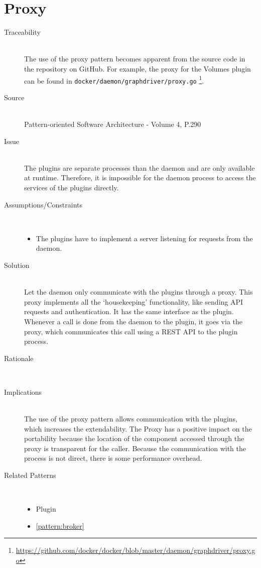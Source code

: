 \section{Proxy}
\begin{description}

\item [Traceability]~\\
The use of the {proxy} pattern becomes apparent from the source code in the repository on GitHub.
For example, the proxy for the Volumes plugin can be found in \verb|docker/daemon/graphdriver/proxy.go| \footnote{\url{https://github.com/docker/docker/blob/master/daemon/graphdriver/proxy.go}}.

\item [Source]~\\
Pattern-oriented Software Architecture - Volume 4, P.290 \cite{wiley4}

\item [Issue]~\\
The plugins are separate processes than the daemon and are only available at runtime. Therefore, it is impossible for the daemon process to access the services of the plugins directly.

\item [Assumptions/Constraints]~
\begin{itemize}
\item The plugins have to implement a server listening for requests from the daemon.
\end{itemize}

\item [Solution]~\\
Let the daemon only communicate with the plugins through a proxy. This proxy implements all the `housekeeping' functionality, like sending API requests and authentication. It has the same interface as the plugin. \\
Whenever a call is done from the daemon to the plugin, it goes via the proxy, which communicates this call using a REST API to the plugin process.

\item [Rationale] ~\\ 

\item [Implications]~\\
The use of the {proxy} pattern allows communication with the plugins, which increases the extendability. 
The Proxy has a positive impact on the portability because the location of the component accessed through the proxy is transparent for the caller.
Because the communication with the process is not direct, there is some performance overhead.

\item [Related Patterns]~
\begin{itemize}
\item Plugin
\item \ref{pattern:broker}
\end{itemize}

\end{description}

